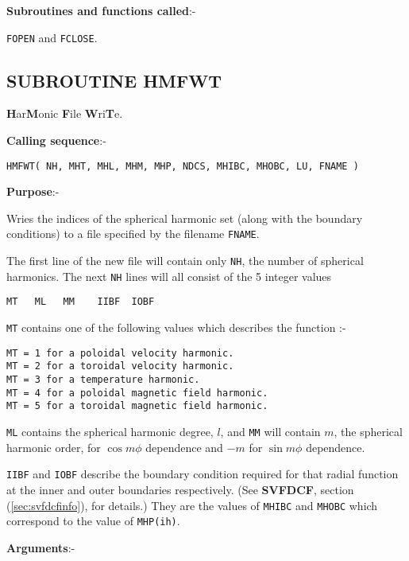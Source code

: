 {\bf Subroutines and functions called}:- \newline

\verb+FOPEN+ and
\verb+FCLOSE+.

\clearpage
\subsection{SUBROUTINE HMFWT}
\label{sec:hmfwtinfo}

{\bf H}ar{\bf M}onic
{\bf F}ile
{\bf W}ri{\bf T}e. \newline

{\bf Calling sequence}:-
\begin{verbatim}
HMFWT( NH, MHT, MHL, MHM, MHP, NDCS, MHIBC, MHOBC, LU, FNAME )
\end{verbatim}

{\bf Purpose}:- \newline

Wries the indices of the spherical harmonic set (along
with the boundary conditions) to a file specified by the
filename \verb+FNAME+.

The first line of the new file will contain only \verb+NH+,
the number of spherical harmonics.
The next \verb+NH+ lines will all consist of the 5 integer
values
\begin{verbatim}
MT   ML   MM    IIBF  IOBF
\end{verbatim}

\verb+MT+ contains one of the following values which describes
the function :-
\begin{verbatim}
MT = 1 for a poloidal velocity harmonic.
MT = 2 for a toroidal velocity harmonic.
MT = 3 for a temperature harmonic.
MT = 4 for a poloidal magnetic field harmonic.
MT = 5 for a toroidal magnetic field harmonic.
\end{verbatim}

\verb+ML+ contains the spherical harmonic degree, $l$, and
\verb+MM+ will contain $m$,
the spherical harmonic order, for $\cos m \phi$ dependence
and $-m$ for $\sin m \phi$ dependence.

\verb+IIBF+ and \verb+IOBF+ describe the boundary condition
required for that radial function at the inner and outer 
boundaries respectively. (See {\bf SVFDCF},
section (\ref{sec:svfdcfinfo}), for details.)
They are the values of \verb+MHIBC+ and \verb+MHOBC+ which
correspond to the value of \verb+MHP(ih)+.

{\bf Arguments}:- \newline

